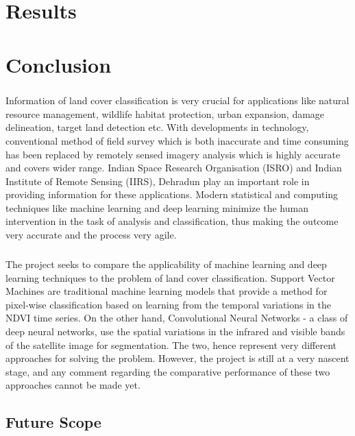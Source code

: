 \documentclass[12pt, a4paper]{report}
\begin{document}

\chapter{Results}


\chapter{Conclusion}

\paragraph{}
Information of land cover classification is very crucial for applications like natural resource management, wildlife habitat protection, urban expansion, damage delineation, target land detection etc. With developments in technology, conventional method of field survey which is both inaccurate and time consuming has been replaced by remotely sensed imagery analysis which is highly accurate and covers wider range. Indian Space Research Organisation (ISRO) and Indian Institute of Remote Sensing (IIRS), Dehradun play an important role in providing information for these applications. Modern statistical and computing techniques like machine learning and deep learning minimize the human intervention in the task of analysis and classification, thus making the outcome very accurate and the process very agile.
\paragraph{}
The project seeks to compare the applicability of machine learning and deep learning techniques to the problem of land cover classification. Support Vector Machines are traditional machine learning models that provide a method for pixel-wise classification based on learning from the temporal variations in the NDVI time series. On the other hand, Convolutional Neural Networks - a class of deep neural networks, use the spatial variations in the infrared and visible bands of the satellite image for segmentation. The two, hence represent very different approaches for solving the problem. However, the project is still at a very nascent stage, and any comment regarding the comparative performance of these two approaches cannot be made yet.

\section{Future Scope}
\end{document}
